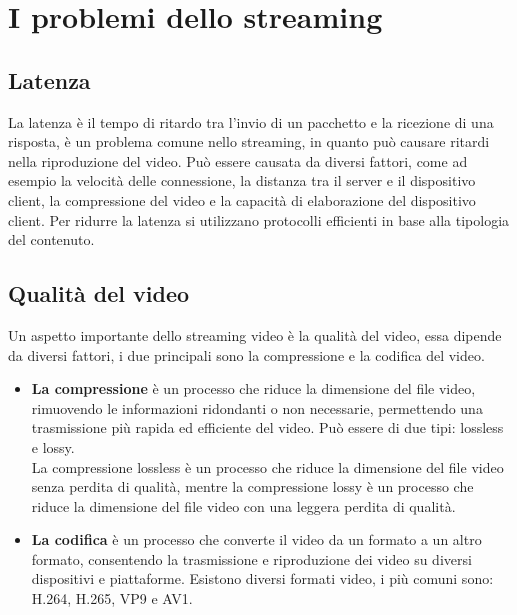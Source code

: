 \section{I problemi dello streaming}
\subsection{Latenza}
La latenza è il tempo di ritardo tra l'invio di un pacchetto e la ricezione di una risposta, è un problema comune nello streaming, in quanto può causare ritardi nella riproduzione del video.
Può essere causata da diversi fattori, come ad esempio la velocità delle connessione, la distanza tra il server e il dispositivo client, la compressione del video e la capacità di elaborazione del dispositivo client.
Per ridurre la latenza si utilizzano protocolli efficienti in base alla tipologia del contenuto.\\

\subsection{Qualità del video}
Un aspetto importante dello streaming video è la qualità del video, essa dipende da diversi fattori, i due principali sono la compressione e la codifica del video.\\

\begin{itemize}
    \item \textbf{La compressione} è un processo che riduce la dimensione del file video, rimuovendo le informazioni ridondanti o non necessarie, permettendo una trasmissione più rapida ed efficiente del video.
Può essere di due tipi: lossless e lossy.\\
La compressione lossless è un processo che riduce la dimensione del file video senza perdita di qualità, mentre la compressione lossy è un processo che riduce
la dimensione del file video con una leggera perdita di qualità.\\ 
\item \textbf{La codifica} è un processo che converte il video da un formato a un altro formato, consentendo la trasmissione e riproduzione dei video su diversi dispositivi e piattaforme.
Esistono diversi formati video, i più comuni sono: H.264, H.265, VP9 e AV1.\\

\end{itemize}


